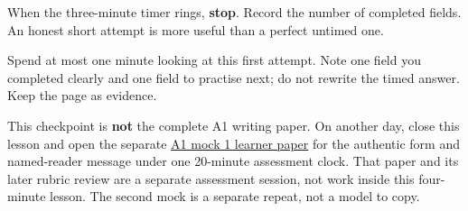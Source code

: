 When the three-minute timer rings, \textbf{stop}. Record the number of completed fields. An honest short attempt is more useful than a perfect untimed one.

\begin{tcolorbox}[breakable,colback=teal!4,colframe=teal!35!black,title={Before you move on}]
Spend at most one minute looking at this first attempt. Note one field you completed clearly and one field to practise next; do not rewrite the timed answer. Keep the page as evidence.

This checkpoint is \textbf{not} the complete A1 writing paper. On another day, close this lesson and open the separate \href{https://github.com/adhithyan15/coding-adventures/blob/main/code/learning/human-languages/malayalam/mocks/a1/mock-1.md}{A1 mock 1 learner paper} for the authentic form and named-reader message under one 20-minute assessment clock. That paper and its later rubric review are a separate assessment session, not work inside this four-minute lesson. The second mock is a separate repeat, not a model to copy.
\end{tcolorbox}
